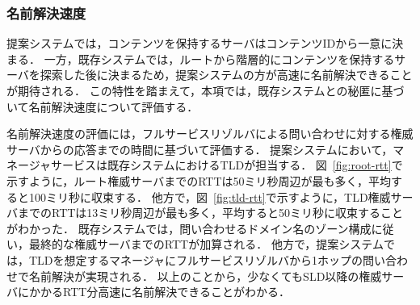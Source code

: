 \newpage
\subsubsection{名前解決速度}
\label{sec:resolution_speed}
提案システムでは，コンテンツを保持するサーバはコンテンツIDから一意に決まる．
一方，既存システムでは，ルートから階層的にコンテンツを保持するサーバを探索した後に決まるため，提案システムの方が高速に名前解決できることが期待される．
この特性を踏まえて，本項では，既存システムとの秘匿に基づいて名前解決速度について評価する．

名前解決速度の評価には，フルサービスリゾルバによる問い合わせに対する権威サーバからの応答までの時間に基づいて評価する．
提案システムにおいて，マネージャサービスは既存システムにおけるTLDが担当する．
図~\ref{fig:root-rtt}で示すように，ルート権威サーバまでのRTTは50ミリ秒周辺が最も多く，平均すると100ミリ秒に収束する．
他方で，図~\ref{fig:tld-rtt}で示すように，TLD権威サーバまでのRTTは13ミリ秒周辺が最も多く，平均すると50ミリ秒に収束することがわかった．
既存システムでは，問い合わせるドメイン名のゾーン構成に従い，最終的な権威サーバまでのRTTが加算される．
他方で，提案システムでは，TLDを想定するマネージャにフルサービスリゾルバから1ホップの問い合わせで名前解決が実現される．
以上のことから，少なくてもSLD以降の権威サーバにかかるRTT分高速に名前解決できることがわかる．
